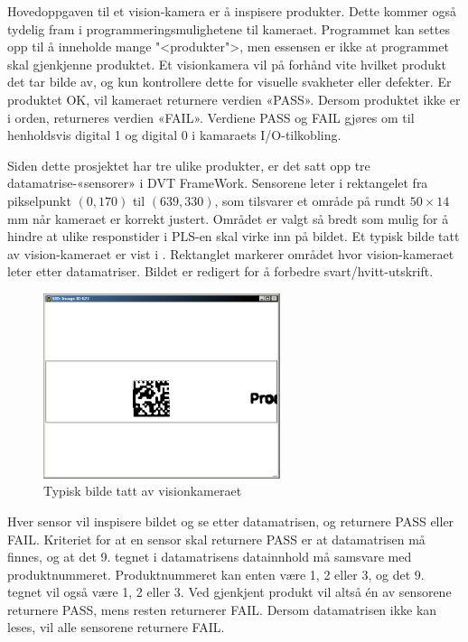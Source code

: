 \documentclass[Visionprosjekt.tex]{subfiles}
\begin{document}

Hovedoppgaven til et vision-kamera er å inspisere produkter. Dette kommer også tydelig fram i programmeringsmulighetene til kameraet. Programmet kan settes opp til å inneholde mange "<produkter">, men essensen er ikke at programmet skal gjenkjenne produktet. Et visionkamera vil på forhånd vite hvilket produkt det tar bilde av, og  kun kontrollere dette for visuelle svakheter eller defekter. Er produktet OK, vil kameraet returnere verdien «PASS». Dersom produktet ikke er i orden, returneres verdien «FAIL». Verdiene PASS og FAIL gjøres om til henholdsvis digital 1 og digital 0 i kamaraets I/O-tilkobling. \cite{framework}

Siden dette prosjektet har tre ulike produkter, er det satt opp tre datamatrise-«sensorer» i DVT FrameWork. Sensorene leter i rektangelet fra pikselpunkt $(0,170)$ til $(639,330)$, som tilsvarer et område på rundt $50\times14$\,mm når kameraet er korrekt justert.
Området er valgt så bredt som mulig for å hindre at ulike responstider i PLS-en skal virke inn på bildet.
Et typisk bilde tatt av vision-kameraet er vist i . Rektanglet markerer området hvor vision-kameraet leter etter datamatriser. Bildet er redigert for å forbedre svart/hvitt-utskrift.

\begin{figure}[ht]
	\centering
		\includegraphics[width=0.618\textwidth]{bilder/visionbilde.png}
	\caption{Typisk bilde tatt av visionkameraet}
    \label{fig:visionbilde}
\end{figure}



Hver sensor vil inspisere bildet og se etter datamatrisen, og returnere PASS eller FAIL. Kriteriet for at en sensor skal returnere PASS er at datamatrisen må finnes, og at det 9. tegnet i datamatrisens datainnhold må samsvare med produktnummeret. Produktnummeret kan  enten være 1, 2 eller 3, og det 9. tegnet vil også være 1, 2 eller 3. Ved  gjenkjent produkt vil altså én av sensorene returnere  PASS, mens resten returnerer FAIL. Dersom datamatrisen ikke kan leses, vil alle sensorene returnere  FAIL.
\end{document}
